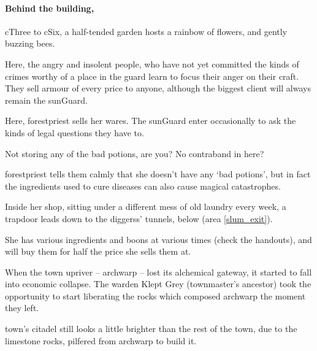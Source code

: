 \begin{multicols}{2}
\paragraph{Behind the building,}
\gls{cThree} to \gls{cSix}, a half-tended garden hosts a rainbow of flowers, and gently buzzing bees.


Here, the angry and insolent people, who have not yet committed the kinds of crimes worthy of a place in the \gls{guard} learn to focus their anger on their craft.
They sell armour of every price to anyone, although the biggest client will always remain the \gls{sunGuard}.


Here, \gls{forestpriest} sells her wares.
The \gls{sunGuard} enter occasionally to ask the kinds of legal questions they have to.

\begin{speechtext}
  Not storing any of the bad potions, are you?
  No contraband in here?
\end{speechtext}

\Gls{forestpriest} tells them calmly that she doesn't have any `bad potions', but in fact the \glspl{ingredient} used to cure diseases can also cause magical catastrophes.

Inside her shop, sitting under a different mess of old laundry every week, a trapdoor leads down to the \glspl{diggers}' tunnels, below (area \vref{slum_exit}).

She has various \glspl{ingredient} and \glspl{boon} at various times (check the handouts), and will buy them for half the price she sells them at.



\begin{exampletext}
  When the town upriver -- \gls{archwarp} -- lost its alchemical gateway, it started to fall into economic collapse.
  The \Gls{warden} Klept Grey (\gls{townmaster}'s ancestor) took the opportunity to start liberating the rocks which composed \gls{archwarp} the moment they left.

  \Gls{town}'s citadel still looks a little brighter than the rest of the town, due to the limestone rocks, pilfered from \gls{archwarp} to build it.
\end{exampletext}


\end{multicols}
